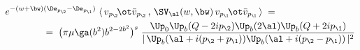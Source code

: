 \begin{equation}\label{V-matel}
\begin{aligned}
{} & e^{-(w+\bw)(\De_{p_\2}-\De_{p_\1})}\;
\langle\,  v_{p_\2}\!\ot \bar{v}_{p_\2}\, ,\,\SV_{\al}(w,\bw) \,
v_{p_\1}\!\ot \bar{v}_{p_\1}\, \rangle\;=\;\\
& \qquad\qquad =\;  \big(\pi\mu\ga(b^2)b^{2-2b^2}\big)^s\;
\frac{\Up_0
\Up_b(Q-2ip_\2)\Up_b(2\al)\Up_b(Q+2ip_\1)}{|\, \Up_b(\al+i(p_\2+p_\1))
\Up_b(\al+i(p_\2-p_\1))\,|^2}
\end{aligned}
\end{equation}

